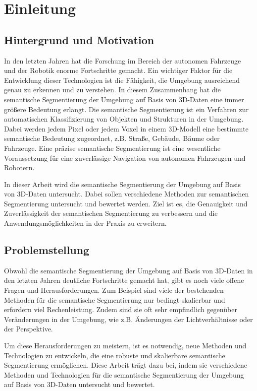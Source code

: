 \chapter{Einleitung}
\section{Hintergrund und Motivation}

In den letzten Jahren hat die Forschung im Bereich der autonomen Fahrzeuge und
der Robotik enorme Fortschritte gemacht. Ein wichtiger Faktor für die
Entwicklung dieser Technologien ist die Fähigkeit, die Umgebung ausreichend
genau zu erkennen und zu verstehen. In diesem Zusammenhang hat die semantische
Segmentierung der Umgebung auf Basis von 3D-Daten eine immer größere Bedeutung
erlangt. Die semantische Segmentierung ist ein Verfahren zur automatischen
Klassifizierung von Objekten und Strukturen in der Umgebung. Dabei werden jedem
Pixel oder jedem Voxel in einem 3D-Modell eine bestimmte semantische Bedeutung
zugeordnet, z.B. Straße, Gebäude, Bäume oder Fahrzeuge. Eine präzise
semantische Segmentierung ist eine wesentliche Voraussetzung für eine
zuverlässige Navigation von autonomen Fahrzeugen und Robotern.

In dieser Arbeit wird die semantische Segmentierung der Umgebung auf Basis von
3D-Daten untersucht. Dabei sollen verschiedene Methoden zur semantischen
Segmentierung untersucht und bewertet werden. Ziel ist es, die Genauigkeit und
Zuverlässigkeit der semantischen Segmentierung zu verbessern und die
Anwendungsmöglichkeiten in der Praxis zu erweitern.

\section{Problemstellung}

Obwohl die semantische Segmentierung der Umgebung auf Basis von 3D-Daten in den
letzten Jahren deutliche Fortschritte gemacht hat, gibt es noch viele offene
Fragen und Herausforderungen. Zum Beispiel sind viele der bestehenden Methoden
für die semantische Segmentierung nur bedingt skalierbar und erfordern viel
Rechenleistung. Zudem sind sie oft sehr empfindlich gegenüber Veränderungen in
der Umgebung, wie z.B. Änderungen der Lichtverhältnisse oder der Perspektive.

Um diese Herausforderungen zu meistern, ist es notwendig, neue Methoden und
Technologien zu entwickeln, die eine robuste und skalierbare semantische
Segmentierung ermöglichen. Diese Arbeit trägt dazu bei, indem sie verschiedene
Methoden und Technologien für die semantische Segmentierung der Umgebung auf
Basis von 3D-Daten untersucht und bewertet.
